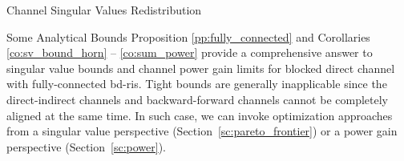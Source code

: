 \documentclass[journal]{IEEEtran}
\begin{document}
\begin{section}{Channel Singular Values Redistribution}
\begin{subsection}{Some Analytical Bounds}
		Proposition \ref{pp:fully_connected} and Corollaries \ref{co:sv_bound_horn} -- \ref{co:sum_power} provide a comprehensive answer to singular value bounds and channel power gain limits for blocked direct channel with fully-connected \gls{bd}-\gls{ris}.
		Tight bounds are generally inapplicable since the direct-indirect channels and backward-forward channels cannot be completely aligned at the same time.
		In such case, we can invoke optimization approaches from a singular value perspective (Section~\ref{sc:pareto_frontier}) or a power gain perspective (Section~\ref{sc:power}).
	\end{subsection}
\end{section}
\end{document}
